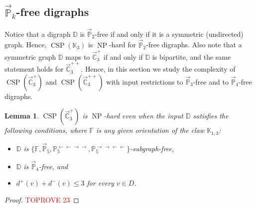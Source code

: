 \documentclass{article}
\newtheorem{lemma}[theorem]{Lemma}
\theoremstyle{definition}
\theoremstyle{remark}
\DeclareMathOperator{\NP}{NP}
\DeclareMathOperator{\CSP}{CSP}
\newcommand{\bC}{{\mathbb C}}
\newcommand{\bD}{{\mathbb D}}
\newcommand{\bF}{{\mathbb F}}
\newcommand{\bK}{{\mathbb K}}
\newcommand{\bP}{{\mathbb P}}
\begin{document}
\subsection{$\vec{\bP}_k$-free digraphs}

Notice that a digraph $\bD$ is $\vec{\bP}_2$-free if and only if it is a symmetric (undirected) graph.
Hence,  $\CSP(\bK_3)$ is $\NP$-hard for $\vec{\bP}_2$-free digraphs. Also note that a symmetric
graph $\bD$ maps to $\vec{\bC}_3^+$ if and only if $\bD$ is bipartite, and the same statement holds
for $\vec{\bC}_3^{++}$. Hence, in this section we study the complexity of $\CSP(\vec{\bC}_3^+)$
and $\CSP(\vec{\bC}_3^{++})$ with input restrictions to $\vec{\bP}_3$-free and to 
$\vec{\bP}_4$-free digraphs.



\begin{lemma}\label{lem:C3+-P4-free}
    $\CSP(\vec{\bC}_3^+)$ is $\NP$-hard even when the input
    $\bD$ satisfies the following conditions, where $\bF$ is any given orientation of the claw $\bK_{1,3}$:
    \begin{itemize}
        \item $\bD$ is $\{\bF,\vec{\bP}_5,\bP_5^{\leftarrow\leftarrow\to\to},\bP_5^{\to\to\leftarrow\leftarrow}\}$-subgraph-free,
        \item $\bD$ is $\vec{\bP}_4$-free, and
        \item $d^+(v) + d^-(v) \le 3$ for every $v\in D$.
    \end{itemize}
\end{lemma}
\begin{proof}\textcolor{red}{TOPROVE 23}\end{proof}
\end{document}
